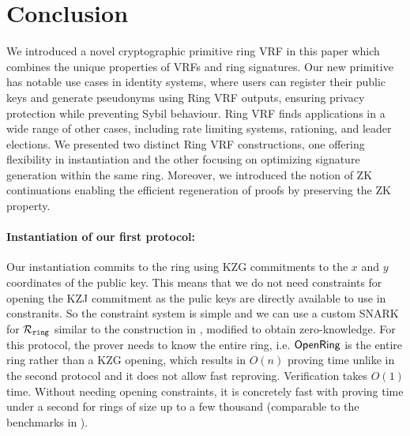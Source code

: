 \section{Conclusion}
\label{sec:conclusion}

We introduced a novel cryptographic primitive ring VRF in this paper which combines the unique properties of VRFs  and ring signatures. Our new primitive has notable use cases in identity systems, where users can register their public keys and generate pseudonyms using Ring VRF outputs, ensuring privacy protection while preventing Sybil behaviour. Ring VRF finds applications in a wide range of other cases, including rate limiting systems, rationing, and leader elections. We presented two distinct Ring VRF constructions, one offering flexibility in instantiation and the other focusing on optimizing signature generation within the same ring. Moreover, we introduced the notion of ZK continuations enabling the efficient regeneration of proofs by preserving the ZK property.

\paragraph{Instantiation of our first protocol:}  Our instantiation commits to the ring using KZG commitments to the $ x $ and $ y $ coordinates of the public key. This means that we do not need constraints for opening the KZJ commitment as the pulic keys are directly available to use in constranits.  So the constraint system is simple and we can use a custom SNARK for $\mathcal{R}_{\mathtt{ring}}$ similar to the construction in \cite{accountable}, modified to obtain zero-knowledge.  For this protocol, the prover needs to know the entire ring, i.e. ${\mathsf{OpenRing}}$ is the entire ring rather than a KZG opening, which results in $O(n)$ proving time unlike in the second protocol and it does not allow fast reproving.
 Verification takes $O(1)$ time. Without needing opening constraints, it is concretely fast with proving time under a second for rings of size up to a few thousand (comparable to the benchmarks in \cite{accountable}).  



